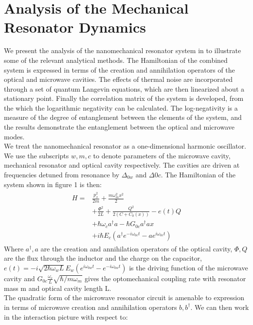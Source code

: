 \documentclass[a4paper,11pt, twocolumn]{article}
\numberwithin{equation}{section}
\begin{document}
\section{Analysis of the Mechanical Resonator Dynamics}
We present the analysis of the nanomechanical resonator system in \cite{nanoMR} to illustrate some of the relevant analytical methods.
The Hamiltonian of the combined system is expressed in terms of the creation and annihilation operators of the optical and microwave cavities.
The effects of thermal noise are incorporated through a set of quantum Langevin equations, which are then linearized about a stationary point. 
Finally the correlation matrix of the system is developed, from the which the logarithmic negativity can be calculated.
The log-negativity is a measure of the degree of entanglement between the elements of the system, and the results demonstrate the entanglement between the optical and microwave modes.
\\
We treat the nanomechanical resonator as a one-dimensional harmonic oscillator. 
We use the subscripts $w,m,c$ to denote parameters of the microwave cavity, mechanical resonator and optical cavity respectively.
The cavities are driven at frequencies detuned from resonance by $\Delta_{0w}$ and $\Delta{0c}$.
The Hamiltonian of the system shown in figure 1 is then:
\begin{align}
\begin{split}
 H = &\frac{p_x^2}{2m}+\frac{m\omega_m^2x^2}{2}\\
     &+\frac{\Phi^2}{2L}+\frac{Q^2}{2(C+C_0(x))}-e(t)Q\\
     &+\hbar\omega_c a^\dagger a-\hbar G_{0c}a^\dagger ax\\
     &+i\hbar E_c\left(a^\dagger e^{-i\omega_{0c}t}-ae^{i\omega_{0c}t} \right)
 \end{split}
\end{align}
Where $a^\dagger,a$ are the creation and annihilation operators of the optical cavity, $\Phi,Q$ are the flux through the inductor and the charge on the capacitor,
$e(t)=-i\sqrt{2\hbar\omega_wL}E_w\left(e^{i\omega_{0w}t}-e^{-i\omega_{0w}t} \right)$ is the driving function of the microwave cavity
and $G_{0c}\frac{\omega_c}{L}\sqrt{\hbar/m\omega_m} $ gives the optomechanical coupling rate with resonator mass m and optical cavity length L.
\\
The quadratic form of the microwave resonator circuit is amenable to expression in terms of microwave creation and annihilation operators $b,b^\dagger$.
We can then work in the interaction picture with respect to:
\end{document}
